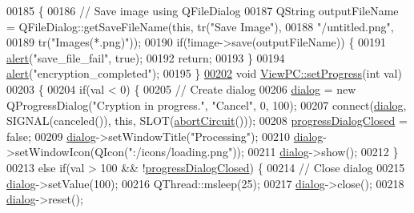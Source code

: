 \begin{DoxyCode}
00185 \{
00186     \textcolor{comment}{// Save image using QFileDialog}
00187     QString outputFileName = QFileDialog::getSaveFileName(\textcolor{keyword}{this}, tr(\textcolor{stringliteral}{"Save Image"}),
00188                                \textcolor{stringliteral}{"/untitled.png"},
00189                                tr(\textcolor{stringliteral}{"Images(*.png)"}));
00190     \textcolor{keywordflow}{if}(!image->save(outputFileName)) \{
00191         \hyperlink{class_view_p_c_a7c467169467789561078abc9d4fe57bd}{alert}(\textcolor{stringliteral}{"save\_file\_fail"}, \textcolor{keyword}{true});
00192         \textcolor{keywordflow}{return};
00193     \}
00194     \hyperlink{class_view_p_c_a7c467169467789561078abc9d4fe57bd}{alert}(\textcolor{stringliteral}{"encryption\_completed"});
00195 \}
\hypertarget{viewpc_8cpp_source_l00202}{}\hyperlink{class_view_p_c_a9c32a1fdb6ead84e5ada8fba8860c7ed}{00202} \textcolor{keywordtype}{void} \hyperlink{class_view_p_c_a9c32a1fdb6ead84e5ada8fba8860c7ed}{ViewPC::setProgress}(\textcolor{keywordtype}{int} val)
00203 \{
00204     \textcolor{keywordflow}{if}(val < 0) \{
00205         \textcolor{comment}{// Create dialog}
00206         \hyperlink{class_view_p_c_a31abbb470fe329b44e6ffee202b903ca}{dialog} = \textcolor{keyword}{new} QProgressDialog(\textcolor{stringliteral}{"Cryption in progress."}, \textcolor{stringliteral}{"Cancel"}, 0, 100);
00207         connect(\hyperlink{class_view_p_c_a31abbb470fe329b44e6ffee202b903ca}{dialog}, SIGNAL(canceled()), \textcolor{keyword}{this}, SLOT(\hyperlink{class_view_p_c_ad7ba2fcf1d17862de15e32432823f7b0}{abortCircuit}()));
00208         \hyperlink{class_view_p_c_add8c82aa2b0b934212aa5bde9277ab36}{progressDialogClosed} = \textcolor{keyword}{false};
00209         \hyperlink{class_view_p_c_a31abbb470fe329b44e6ffee202b903ca}{dialog}->setWindowTitle(\textcolor{stringliteral}{"Processing"});
00210         \hyperlink{class_view_p_c_a31abbb470fe329b44e6ffee202b903ca}{dialog}->setWindowIcon(QIcon(\textcolor{stringliteral}{":/icons/loading.png"}));
00211         \hyperlink{class_view_p_c_a31abbb470fe329b44e6ffee202b903ca}{dialog}->show();
00212     \}
00213     \textcolor{keywordflow}{else} \textcolor{keywordflow}{if}(val > 100 && !\hyperlink{class_view_p_c_add8c82aa2b0b934212aa5bde9277ab36}{progressDialogClosed}) \{
00214         \textcolor{comment}{// Close dialog}
00215         \hyperlink{class_view_p_c_a31abbb470fe329b44e6ffee202b903ca}{dialog}->setValue(100);
00216         QThread::msleep(25);
00217         \hyperlink{class_view_p_c_a31abbb470fe329b44e6ffee202b903ca}{dialog}->close();
00218         \hyperlink{class_view_p_c_a31abbb470fe329b44e6ffee202b903ca}{dialog}->reset();

\end{DoxyCode}
